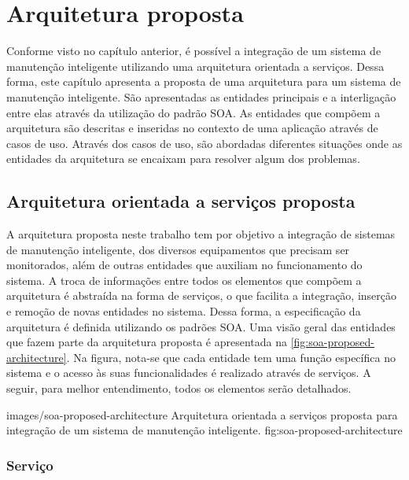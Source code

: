 \chapter{Arquitetura proposta}

Conforme visto no capítulo anterior, é possível a integração de um sistema de manutenção inteligente
utilizando uma arquitetura orientada a serviços. Dessa forma, este capítulo apresenta a proposta de
uma arquitetura para um sistema de manutenção inteligente. São apresentadas as entidades principais
e a interligação entre elas através da utilização do padrão \gls{SOA}. As entidades que compõem a
arquitetura são descritas e inseridas no contexto de uma aplicação através de casos de uso. Através
dos casos de uso, são abordadas diferentes situações onde as entidades da arquitetura se encaixam
para resolver algum dos problemas.

\blindtext



\section{Arquitetura orientada a serviços proposta}
\label{sec:arquitetura-proposta}

A arquitetura proposta neste trabalho tem por objetivo a integração de sistemas de manutenção
inteligente, dos diversos equipamentos que precisam ser monitorados, além de outras entidades que
auxiliam no funcionamento do sistema. A troca de informações entre todos os elementos que compõem a
arquitetura é abstraída na forma de serviços, o que facilita a integração, inserção e remoção de
novas entidades no sistema. Dessa forma, a especificação da arquitetura é definida utilizando os
padrões \gls{SOA}. Uma visão geral das entidades que fazem parte da arquitetura proposta é
apresentada na \cref{fig:soa-proposed-architecture}. Na figura, nota-se que cada entidade tem uma função específica no sistema
e o acesso às suas funcionalidades é realizado através de serviços. A seguir, para melhor
entendimento, todos os elementos serão detalhados.

  {images/soa-proposed-architecture}
  {Arquitetura orientada a serviços proposta para integração de um sistema de manutenção
      inteligente.}
  {fig:soa-proposed-architecture}


\subsection{Serviço}

